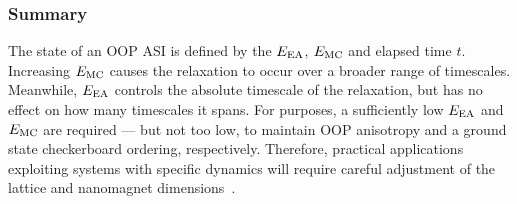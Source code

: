 \subsubsection{Summary}
The state of an OOP ASI is defined by the  $E_\mathrm{EA}$,  $E_\mathrm{MC}$ and elapsed time $t$.
Increasing $E_\mathrm{MC}$ causes the relaxation to occur over a broader range of timescales.
Meanwhile, $E_\mathrm{EA}$ controls the absolute timescale of the relaxation, but has no effect on how many timescales it spans.
For  purposes, a sufficiently low $E_\mathrm{EA}$ and $E_\mathrm{MC}$ are required --- but not too low, to maintain OOP anisotropy and a ground state checkerboard ordering, respectively.
Therefore, practical applications exploiting systems with specific dynamics will require careful adjustment of the lattice and nanomagnet dimensions~\cite{KUR-24}.


